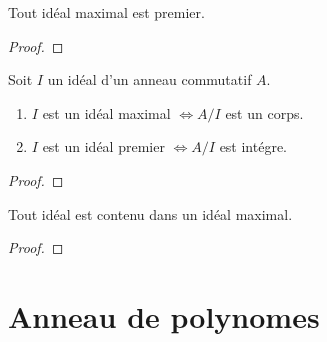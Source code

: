 
\begin{definition} 

\end{definition}

\begin{definition} 

\end{definition}

\begin{definition} 
	
\end{definition}

\begin{definition} [Corps]

\end{definition}

\begin{proposition}
	Tout idéal maximal est premier.
\end{proposition}

\begin{proof}
	
\end{proof}

\begin{proposition}
	Soit $I$ un idéal d'un anneau commutatif $A$.
	\begin{enumerate}
		\item $I$ est un idéal maximal $\Leftrightarrow A/I$ est un
			corps.
		\item $I$ est un idéal premier $\Leftrightarrow A/I$ est
			intégre.
	\end{enumerate}
\end{proposition}

\begin{proof}
	
\end{proof}

\begin{exemple}
\end{exemple}

\begin{theorem}
	Tout idéal est contenu dans un idéal maximal.
\end{theorem}

\begin{proof}
	
\end{proof}
\section{Anneau de polynomes}

